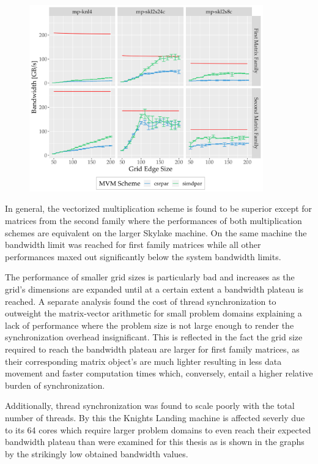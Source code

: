     \begin{figure}[H]
      \centering
      \captionsetup{width=0.9\textwidth}
      \includegraphics[width=0.9\textwidth]{assets/mvm-perturbed-new}
       {}
      \label{fig:mvm-perturbed-new}
    \end{figure}

    In general, the vectorized multiplication scheme is found to be superior except for matrices from the second family
    where the performances of both multiplication schemes are equivalent on the larger Skylake machine. On the same
    machine the bandwidth limit was reached for first family matrices while all other performances maxed out
    significantly below the system bandwidth limits.

    The performance of smaller grid sizes is particularly bad and increases as the grid's dimensions are expanded until
    at a certain extent a bandwidth plateau is reached. A separate analysis found the cost of thread synchronization to
    outweight the matrix-vector arithmetic for small problem domains explaining a lack of performance where the
    problem size is not large enough to render the synchronization overhead insignificant. This is reflected in the fact
    the grid size required to reach the bandwidth plateau are larger for first family matrices, as their corresponding
    matrix object's are much lighter resulting in less data movement and faster computation times which, conversely,
    entail a higher relative burden of synchronization.

    Additionally, thread synchronization was found to scale poorly with the total number of threads. By this the Knights
    Landing machine is affected severly due to its 64 cores which require larger problem domains to even reach their
    expected bandwidth plateau than were examined for this thesis as is shown in the graphs by the strikingly low
    obtained bandwidth values.

